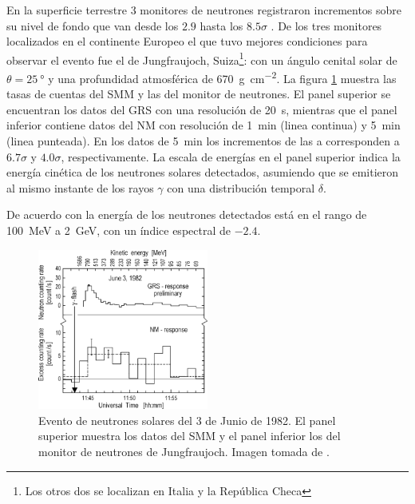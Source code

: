 En la superficie terrestre \num{3} monitores de neutrones registraron incrementos sobre su nivel de fondo que van desde los $2.9$ hasta los $8.5\sigma$ \cite{chupp87}. De los tres monitores localizados en el continente Europeo el que tuvo mejores condiciones para observar el evento fue el de Jungfraujoch, Suiza\footnote{Los otros dos se localizan en Italia y la República Checa}: con un ángulo cenital solar de $\theta=\SI{25}{\degree}$ y una profundidad atmosférica de \SI{670}{\gram\per\square\cm}. La figura \ref{fig:neutrons-ground} muestra las tasas de cuentas del SMM y las del monitor de neutrones. El panel superior se encuentran los datos del GRS con una resolución de \SI{20}{\second}, mientras que el panel inferior contiene datos del NM con resolución de \SI{1}{\minute} (linea continua) y \SI{5}{\minute} (linea punteada). En los datos de \SI{5}{\minute} los incrementos de las  a  corresponden a $6.7\sigma$ y $4.0\sigma$, respectivamente. La escala de energías en el panel superior indica la energía cinética de los neutrones solares detectados, asumiendo que se emitieron al mismo instante de los rayos $\gamma$ con una distribución temporal $\delta$.

De acuerdo con \cite{chupp87} la energía de los neutrones detectados está en el rango de \SI{100}{\mega\electronvolt} a \SI{2}{\giga\electronvolt}, con un índice espectral de $-2.4$.

\begin{figure}
        \centering
        \includegraphics[width=0.5\textwidth]{neutrons-ground.png}
        \caption{Evento de neutrones solares del \num{3} de Junio de \num{1982}. El panel superior muestra los datos del SMM y el panel inferior los del monitor de neutrones de Jungfraujoch. Imagen tomada de \cite{debrunner83}.}
        \label{fig:neutrons-ground}
\end{figure}

